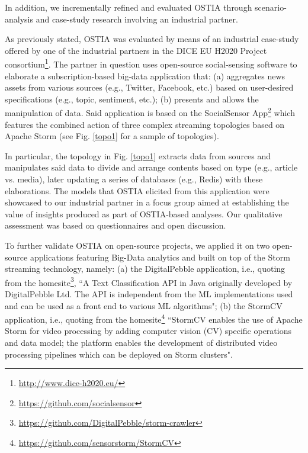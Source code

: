 In addition, we incrementally refined and evaluated OSTIA through scenario-analysis and case-study research \cite{casestudy} involving an industrial partner.

As previously stated, OSTIA was evaluated by means of an industrial case-study offered by one of the industrial partners in the DICE EU H2020 Project consortium\footnote{\url{http://www.dice-h2020.eu/}}. 
The partner in question uses open-source social-sensing software to elaborate a subscription-based big-data application that: (a) aggregates news assets from various sources (e.g., Twitter, Facebook, etc.) based on user-desired specifications (e.g., topic, sentiment, etc.); (b) presents and allows the manipulation of data. Said application is based on the SocialSensor App\footnote{\url{https://github.com/socialsensor}} which features the combined action of three complex streaming topologies based on Apache Storm (see Fig. \ref{topo1} for a sample of topologies).

In particular, the topology in Fig. \ref{topo1} extracts data from sources and manipulates said data to divide and arrange contents based on type (e.g., article vs. media), later updating a series of databases (e.g., Redis) with these elaborations. The models that OSTIA elicited from this application were showcased to our industrial partner in a focus group aimed at establishing the value of insights produced as part of OSTIA-based analyses. Our qualitative assessment was based on questionnaires and open discussion.

To further validate OSTIA on open-source projects, we applied it on two open-source applications featuring Big-Data analytics and built on top of the Storm streaming technology, namely: (a) the DigitalPebble application, i.e., quoting from the homesite\footnote{\url{https://github.com/DigitalPebble/storm-crawler}}, ``A Text Classification API in Java originally developed by DigitalPebble Ltd. The API is independent from the ML implementations used and can be used as a front end to various ML algorithms"; (b) the StormCV application, i.e., quoting from the homesite\footnote{\url{https://github.com/sensorstorm/StormCV}} ``StormCV enables the use of Apache Storm for video processing by adding computer vision (CV) specific operations and data model; the platform enables the development of distributed video processing pipelines which can be deployed on Storm clusters".



